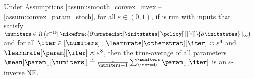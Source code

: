 \begin{theorem}
\label{thm:online_sgda}
    Under Assumptions \ref{assum:smooth_convex_invex}--\ref{assum:convex_param_stoch}, for all $\varepsilon \in (0,1)$, if  is run with inputs that satisfy $\numiters \in \Omega\left( \varepsilon^{-10}\|\nicefrac{\partial\statedist[\initstates][{\policy[][][\dagger]}]}{\partial \initstates} \|_\infty\right)$ and for all $\iter \in [\numiters]$, $\learnrate[\otherstrat][\iter] \asymp  \varepsilon^4$ and
    $\learnrate[\param][\iter] \asymp \varepsilon^8$,   
    then the time-average of all parameters $\mean[{\param[][\numiters]}] \doteq \frac{1}{\numiters + 1}\sum_{\iter = 0}^\numiters \param[][\iter]$ is an $\varepsilon$-inverse NE.
\end{theorem}

 







